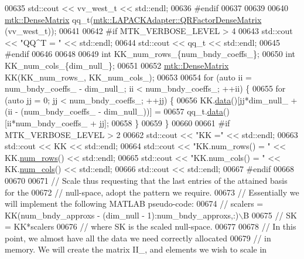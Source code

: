 \begin{DoxyCode}
{{00635   std::cout << vv\_west\_t << std::endl;
00636 \textcolor{preprocessor}{  #endif}
00637 
00639 
00640   \hyperlink{classmtk_1_1DenseMatrix}{mtk::DenseMatrix} qq\_t(\hyperlink{classmtk_1_1LAPACKAdapter_ae5c6e78c9c819c9ac7a6f31bfd011d7a}{mtk::LAPACKAdapter::QRFactorDenseMatrix}
      (vv\_west\_t));
00641 
00642 \textcolor{preprocessor}{  #if MTK\_VERBOSE\_LEVEL > 4}
00643   std::cout << \textcolor{stringliteral}{"QQ^T = "} << std::endl;
00644   std::cout << qq\_t << std::endl;
00645 \textcolor{preprocessor}{  #endif}
00646 
00648 
00649   \textcolor{keywordtype}{int} KK\_num\_rows\_\{num\_bndy\_coeffs\_\};
00650   \textcolor{keywordtype}{int} KK\_num\_cols\_\{dim\_null\_\};
00651 
00652   \hyperlink{classmtk_1_1DenseMatrix}{mtk::DenseMatrix} KK(KK\_num\_rows\_, KK\_num\_cols\_);
00653 
00654   \textcolor{keywordflow}{for} (\textcolor{keyword}{auto} ii = num\_bndy\_coeffs\_ - dim\_null\_; ii < num\_bndy\_coeffs\_; ++ii) \{
00655     \textcolor{keywordflow}{for} (\textcolor{keyword}{auto} jj = 0; jj < num\_bndy\_coeffs\_; ++jj) \{
00656       KK.\hyperlink{classmtk_1_1DenseMatrix_a0c33b8a9e01d157c61ddbdf807c25d84}{data}()[jj*dim\_null\_ + (ii - (num\_bndy\_coeffs\_ - dim\_null\_))] =
00657           qq\_t.\hyperlink{classmtk_1_1DenseMatrix_a0c33b8a9e01d157c61ddbdf807c25d84}{data}()[ii*num\_bndy\_coeffs\_ + jj];
00658     \}
00659   \}
00660 
00661 \textcolor{preprocessor}{  #if MTK\_VERBOSE\_LEVEL > 2}
00662   std::cout << \textcolor{stringliteral}{"KK ="} << std::endl;
00663   std::cout << KK << std::endl;
00664   std::cout << \textcolor{stringliteral}{"KK.num\_rows() = "} << KK.\hyperlink{classmtk_1_1DenseMatrix_a53f3afb3b6a8d21854458aaa9663cc74}{num\_rows}() << std::endl;
00665   std::cout << \textcolor{stringliteral}{"KK.num\_cols() = "} << KK.\hyperlink{classmtk_1_1DenseMatrix_a41747502d468c6728a4be31501b16e0e}{num\_cols}() << std::endl;
00666   std::cout << std::endl;
00667 \textcolor{preprocessor}{  #endif}
00668 
00670 
00671   \textcolor{comment}{// Scale thus requesting that the last entries of the attained basis for the}
00672   \textcolor{comment}{// null-space, adopt the pattern we require.}
00673   \textcolor{comment}{// Essentially we will implement the following MATLAB pseudo-code:}
00674   \textcolor{comment}{//  scalers = KK(num\_bndy\_approxs - (dim\_null - 1):num\_bndy\_approxs,:)\(\backslash\)B}
00675   \textcolor{comment}{//  SK = KK*scalers}
00676   \textcolor{comment}{// where SK is the scaled null-space.}
00677 
00678   \textcolor{comment}{// In this point, we almost have all the data we need correctly allocated}
00679   \textcolor{comment}{// in memory. We will create the matrix II\_, and elements we wish to scale in}
}}
\end{DoxyCode}
